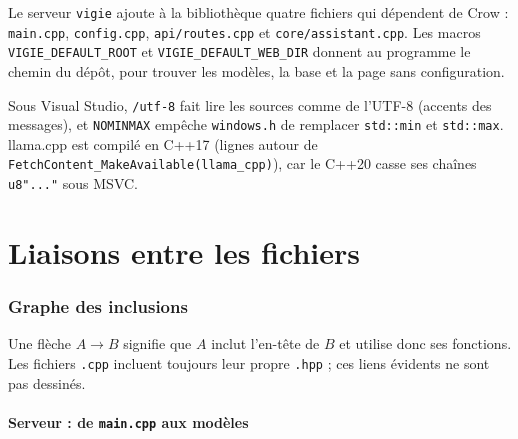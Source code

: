 \documentclass[11pt,a4paper]{article}
\newcommand{\fichier}[1]{\texttt{#1}}
\begin{document}
Le serveur \fichier{vigie} ajoute à la bibliothèque quatre fichiers qui dépendent de Crow : \fichier{main.cpp}, \fichier{config.cpp}, \fichier{api/routes.cpp} et \fichier{core/assistant.cpp}. Les macros \texttt{VIGIE\_DEFAULT\_ROOT} et \texttt{VIGIE\_DEFAULT\_WEB\_DIR} donnent au programme le chemin du dépôt, pour trouver les modèles, la base et la page sans configuration.



Sous Visual Studio, \texttt{/utf-8} fait lire les sources comme de l'UTF-8 (accents des messages), et \texttt{NOMINMAX} empêche \texttt{windows.h} de remplacer \texttt{std::min} et \texttt{std::max}. llama.cpp est compilé en C++17 (lignes autour de \texttt{FetchContent\_MakeAvailable(llama\_cpp)}), car le C++20 casse ses chaînes \texttt{u8"..."} sous MSVC.

\part{Liaisons entre les fichiers}

\section{Graphe des inclusions}

Une flèche \(A \rightarrow B\) signifie que \(A\) inclut l'en-tête de \(B\) et utilise donc ses fonctions. Les fichiers \texttt{.cpp} incluent toujours leur propre \texttt{.hpp} ; ces liens évidents ne sont pas dessinés.

\subsection{Serveur : de \texttt{main.cpp} aux modèles}
\end{document}
